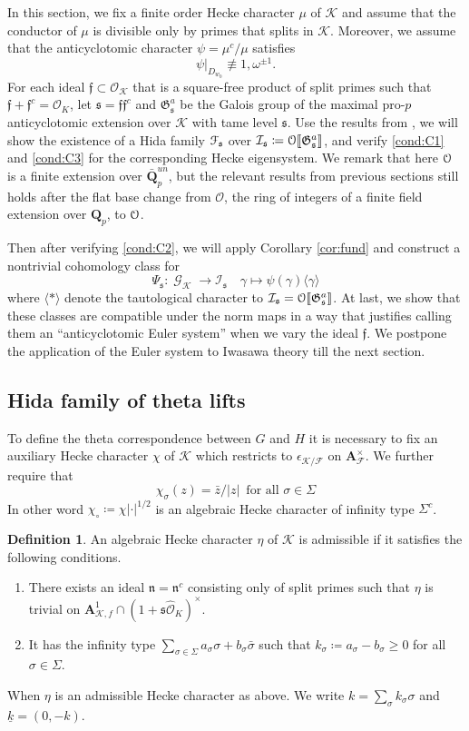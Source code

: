 \documentclass[leqno]{amsart}
\theoremstyle{definition}
\newtheorem{defn}[thm]{Definition}
\theoremstyle{remark}
\newcommand{\oo}{\mathcal{O}}
\newcommand{\eo}{\EuScript{O}}
\newcommand{\Q}{{\mathbf{Q}}}
\newcommand{\Qp}{\mathbf{Q}_p}
\newcommand{\A}{\mathbf A}
\DeclareMathOperator{\Gal}{\mathcal{G}}
\newcommand{\ff}{\mathfrak{f}}
\newcommand{\fn}{\mathfrak{n}}
\newcommand{\fs}{\mathfrak{s}}
\newcommand{\F}{{\mathcal{F}}} %
\newcommand{\K}{{\mathcal{K}}} %
\newcommand{\qch}{\epsilon} %
\newcommand{\fG}{\mathfrak{G}}
\newcommand{\wt}[1]{\underline{ #1 }}
\newcommand{\euF}{\EuScript{F}} %
\newcommand{\I}{\mathcal{I}} %
\begin{document}
In this section,
we fix a finite order Hecke character $\mu$ of $\K$
and assume that the conductor of $\mu$
is divisible only by primes that splits in $\K$.
Moreover, we assume that the anticyclotomic character
$\psi=\mu^c/\mu$ satisfies
\begin{equation}\label{cond:gen_psi}
    \psi\vert_{D_{w_0}}\not\equiv 1,\omega^{\pm1}.
\end{equation}
For each ideal $\ff\subset \oo_\K$
that is a square-free product of split primes
such that $\ff+\ff^c=\oo_K$,
let $\fs=\ff\ff^c$
and $\fG^a_{\fs}$ be the Galois group
of the maximal pro-$p$ anticyclotomic
extension over $\K$ with tame level $\fs$.
Use the results from \cite{lee},
we will show the existence of a Hida family
$\euF_\fs$ over $\I_\fs\coloneqq \eo\llbracket\fG_\fs^a\rrbracket$,
and verify \ref{cond:C1} and \ref{cond:C3}
for the corresponding Hecke eigensystem.
We remark that here $\eo$ is a finite extension
over $\bar{\Q}_p^{un}$,
but the relevant results from previous sections still holds 
after the flat base change from $\oo$,
the ring of integers of a finite field extension over $\Qp$,
to $\eo$.

Then after verifying \ref{cond:C2},
we will apply Corollary \ref{cor:fund}
and construct a nontrivial cohomology class for 
\[
    \Psi_\fs\colon\Gal_\K\to \I_\fs\quad
    \gamma\mapsto \psi(\gamma)\langle \gamma\rangle
\]
where $\langle*\rangle$ denote the tautological character
to $\I_\fs=\eo\llbracket\fG_\fs^a\rrbracket$.
At last, we show that these classes are compatible under the norm maps 
in a way that justifies calling them
an ``anticyclotomic Euler system''
when we vary the ideal $\ff$.
We postpone the application of the Euler system
to Iwasawa theory till the next section.


\subsection{Hida family of theta lifts}


To define the theta correspondence between $G$ and $H$
it is necessary to fix an auxiliary Hecke character
$\chi$ of $\K$ which restricts to 
$\qch_{\K/\F}$ on $\A_\F^\times$.
We further require that
\[
\chi_\sigma(z)=\bar{z}/|z|\,
\text{ for all }\sigma\in \Sigma 
\]
In other word $\chi_\circ\coloneqq \chi|\cdot|^{1/2}$
is an algebraic Hecke character
of infinity type $\Sigma^c$.

\begin{defn}\label{def:admchar}
An algebraic Hecke character $\eta$ of $\K$ is admissible
if it satisfies the following conditions.
\begin{enumerate}
\item 
There exists an ideal $\fn=\fn^c$
consisting only of split primes such that 
$\eta$ is trivial on
$\A_{\K,f}^1\cap (1+\fs\widehat{\oo}_K)^\times$.
\item 
It has the infinity type
$\sum_{\sigma\in\Sigma}a_\sigma\sigma+b_\sigma\bar{\sigma}$
such that 
$k_\sigma\coloneqq a_\sigma-b_\sigma\geq0$
for all $\sigma\in\Sigma$.
\end{enumerate}
When $\eta$ is an admissible Hecke character as above.
We write $k=\sum_{\sigma}k_\sigma\sigma$ and $\wt{k}=(0,-k)$.
\end{defn}
\end{document}

